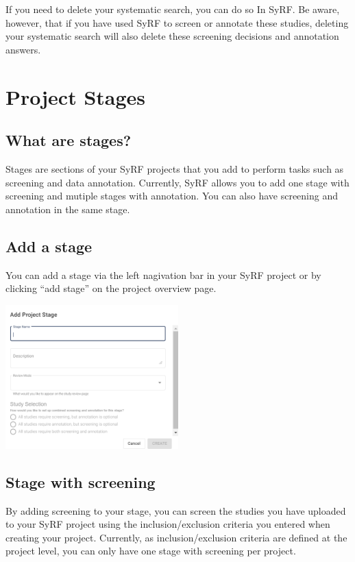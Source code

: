 \documentclass[
]{book}
\begin{document}
If you need to delete your systematic search, you can do so In SyRF. Be aware, however, that if you have used SyRF to screen or annotate these studies, deleting your systematic search will also delete these screening decisions and annotation answers.

\hypertarget{projectstages}{%
\chapter{Project Stages}\label{projectstages}}

\hypertarget{what-are-stages}{%
\section{What are stages?}\label{what-are-stages}}

Stages are sections of your SyRF projects that you add to perform tasks such as screening and data annotation. Currently, SyRF allows you to add one stage with screening and mutiple stages with annotation. You can also have screening and annotation in the same stage.

\hypertarget{add-a-stage}{%
\section{Add a stage}\label{add-a-stage}}

You can add a stage via the left nagivation bar in your SyRF project or by clicking ``add stage'' on the project overview page.

\includegraphics[width=0.5\textwidth,height=0.5\textheight]{figs/08_01_add_stage.png}

\hypertarget{stage-with-screening}{%
\section{Stage with screening}\label{stage-with-screening}}

By adding screening to your stage, you can screen the studies you have uploaded to your SyRF project using the inclusion/exclusion criteria you entered when creating your project. Currently, as inclusion/exclusion criteria are defined at the project level, you can only have one stage with screening per project.
\end{document}
